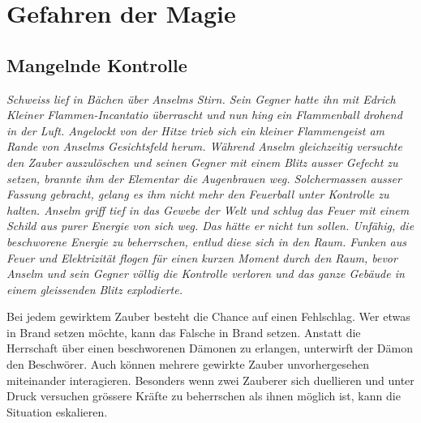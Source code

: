 \documentclass[10pt,twoside,twocolumn,openany]{book}
\begin{document}
\newpage \section{Gefahren der Magie}
\begin{multicols}{2}
\subsection{Mangelnde Kontrolle}
\textit{Schweiss lief in Bächen über Anselms Stirn. Sein Gegner hatte ihn mit Edrich Kleiner Flammen-Incantatio überrascht und nun hing ein Flammenball drohend in der Luft. Angelockt von der Hitze trieb sich ein kleiner Flammengeist am Rande von Anselms Gesichtsfeld herum. Während Anselm gleichzeitig versuchte den Zauber auszulöschen und seinen Gegner mit einem Blitz ausser Gefecht zu setzen, brannte ihm der Elementar die Augenbrauen weg. Solchermassen ausser Fassung gebracht, gelang es ihm nicht mehr den Feuerball unter Kontrolle zu halten. Anselm griff tief in das Gewebe der Welt und schlug das Feuer mit einem Schild aus purer Energie von sich weg. Das hätte er nicht tun sollen. Unfähig, die beschworene Energie zu beherrschen, entlud diese sich in den Raum. Funken aus Feuer und Elektrizität flogen für einen kurzen Moment durch den Raum, bevor Anselm und sein Gegner völlig die Kontrolle verloren und das ganze Gebäude in einem gleissenden Blitz explodierte.
}

Bei jedem gewirktem Zauber besteht die Chance auf einen Fehlschlag. Wer etwas in Brand setzen möchte, kann das Falsche in Brand setzen. Anstatt die Herrschaft über einen beschworenen Dämonen zu erlangen, unterwirft der Dämon den Beschwörer. Auch können mehrere gewirkte Zauber unvorhergesehen miteinander interagieren.
Besonders wenn zwei Zauberer sich duellieren und unter Druck versuchen grössere Kräfte zu beherrschen als ihnen möglich ist, kann die Situation eskalieren.


\end{multicols}
\end{document}
